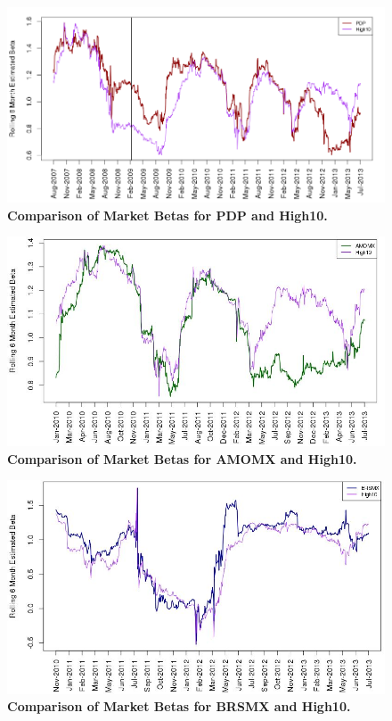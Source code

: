 \documentclass[12pt]{article}
\begin{document}
\begin{figure}[p]
\caption{\textbf{Comparison of Market Betas for PDP and High10.}}
\includegraphics[scale=0.45]{PDPbetas.png}
\end{figure}

\begin{figure}[p]
\caption{\textbf{Comparison of Market Betas for AMOMX and High10.}}
\includegraphics[scale=0.65]{AMOMXbetas.jpg}
\end{figure}

\begin{figure}[p]
\caption{\textbf{Comparison of Market Betas for BRSMX and High10.}}
\includegraphics[scale=0.65]{BRSMXbetas.jpg}
\end{figure}
\end{document}

